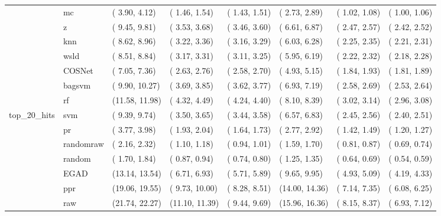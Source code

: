 \begin{table}[H]
{\begin{tabular}{llllllll}
 & mc & ( 3.90,  4.12) & ( 1.46,  1.54) & ( 1.43,  1.51) & ( 2.73,  2.89) & ( 1.02,  1.08) & ( 1.00,  1.06)\\

 & z & ( 9.45,  9.81) & ( 3.53,  3.68) & ( 3.46,  3.60) & ( 6.61,  6.87) & ( 2.47,  2.57) & ( 2.42,  2.52)\\

 & knn & ( 8.62,  8.96) & ( 3.22,  3.36) & ( 3.16,  3.29) & ( 6.03,  6.28) & ( 2.25,  2.35) & ( 2.21,  2.31)\\

 & wsld & ( 8.51,  8.84) & ( 3.17,  3.31) & ( 3.11,  3.25) & ( 5.95,  6.19) & ( 2.22,  2.32) & ( 2.18,  2.28)\\

 & COSNet & ( 7.05,  7.36) & ( 2.63,  2.76) & ( 2.58,  2.70) & ( 4.93,  5.15) & ( 1.84,  1.93) & ( 1.81,  1.89)\\

 & bagsvm & ( 9.90, 10.27) & ( 3.69,  3.85) & ( 3.62,  3.77) & ( 6.93,  7.19) & ( 2.58,  2.69) & ( 2.53,  2.64)\\

 & rf & (11.58, 11.98) & ( 4.32,  4.49) & ( 4.24,  4.40) & ( 8.10,  8.39) & ( 3.02,  3.14) & ( 2.96,  3.08)\\

\multirow{-15}{*}{\raggedright\arraybackslash top\_20\_hits} & svm & ( 9.39,  9.74) & ( 3.50,  3.65) & ( 3.44,  3.58) & ( 6.57,  6.83) & ( 2.45,  2.56) & ( 2.40,  2.51)\\
\cmidrule{1-8}
 & pr & ( 3.77,  3.98) & ( 1.93,  2.04) & ( 1.64,  1.73) & ( 2.77,  2.92) & ( 1.42,  1.49) & ( 1.20,  1.27)\\

 & randomraw & ( 2.16,  2.32) & ( 1.10,  1.18) & ( 0.94,  1.01) & ( 1.59,  1.70) & ( 0.81,  0.87) & ( 0.69,  0.74)\\

 & random & ( 1.70,  1.84) & ( 0.87,  0.94) & ( 0.74,  0.80) & ( 1.25,  1.35) & ( 0.64,  0.69) & ( 0.54,  0.59)\\

 & EGAD & (13.14, 13.54) & ( 6.71,  6.93) & ( 5.71,  5.89) & ( 9.65,  9.95) & ( 4.93,  5.09) & ( 4.19,  4.33)\\

 & ppr & (19.06, 19.55) & ( 9.73, 10.00) & ( 8.28,  8.51) & (14.00, 14.36) & ( 7.14,  7.35) & ( 6.08,  6.25)\\

 & raw & (21.74, 22.27) & (11.10, 11.39) & ( 9.44,  9.69) & (15.96, 16.36) & ( 8.15,  8.37) & ( 6.93,  7.12)\\


\end{tabular}}
\end{table}
